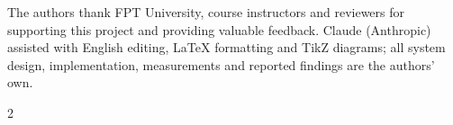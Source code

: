 The authors thank FPT University, course instructors and reviewers for supporting this project and providing valuable feedback. Claude (Anthropic) assisted with English editing, \LaTeX{} formatting and TikZ diagrams; all system design, implementation, measurements and reported findings are the authors' own.

\begingroup
\def\IEEEbibitemsep{0pt}
\def\footnotesize{\fontsize{7.2pt}{8.2pt}\selectfont}
\setlength{\multicolsep}{2pt plus 1pt minus 1pt}
\begin{multicols}{2}


\end{multicols}
\endgroup



